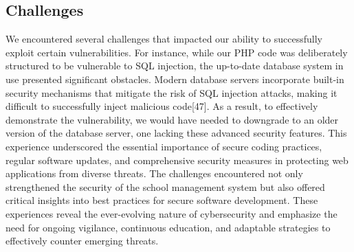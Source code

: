 \documentclass[letterpaper,twocolumn]{article}
\begin{document}
\subsection{Challenges}
We encountered several challenges that impacted our ability to successfully exploit certain vulnerabilities. For instance, while our PHP code was deliberately structured to be vulnerable to SQL injection, the up-to-date database system in use presented significant obstacles. Modern database servers incorporate built-in security mechanisms that mitigate the risk of SQL injection attacks, making it difficult to successfully inject malicious code[47]. As a result, to effectively demonstrate the vulnerability, we would have needed to downgrade to an older version of the database server, one lacking these advanced security features. 
This experience underscored the essential importance of secure coding practices, regular software updates, and comprehensive security measures in protecting web applications from diverse threats. The challenges encountered not only strengthened the security of the school management system but also offered critical insights into best practices for secure software development. These experiences reveal the ever-evolving nature of cybersecurity and emphasize the need for ongoing vigilance, continuous education, and adaptable strategies to effectively counter emerging threats.
\end{document}

